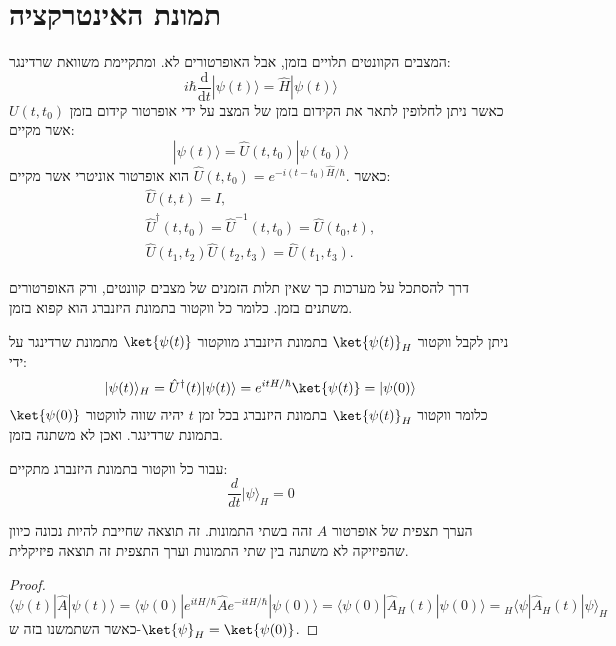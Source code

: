 \documentclass{tstextbook}
\begin{document}
\section{תמונת האינטרקציה}

\begin{reminder}
המצבים הקוונטים תלויים בזמן, אבל האופרטורים לא. ומתקיימת משוואת שרדינגר:
$$i\hbar{\frac{\mathrm{d}}{\mathrm{d} t}}|\psi(t)\rangle={\hat{H}}|\psi(t)\rangle$$
כאשר ניתן לחלופין לתאר את הקידום בזמן של המצב על ידי אופרטור קידום בזמן \(U(t,t_{0})\) אשר מקיים:
$$|\psi(t)\rangle=\hat{U}(t,t_{0})|\psi(t_{0})\rangle$$
כאשר \(\hat{U}(t,t_{0})=e^{-i(t-t_{0})\hat{H}/\hbar}.\) הוא אופרטור אוניטרי אשר מקיים:
$$\begin{array}{c}{{\hat{U}(t,t)=I,}}\\ {{\hat{U}^{\dagger}(t,t_{0})=\hat{U}^{-1}(t,t_{0})=\hat{U}(t_{0},t),}}\\ {{\hat{U}(t_{1},t_{2})\hat{U}(t_{2},t_{3})=\hat{U}(t_{1},t_{3}).}}\end{array}$$

\end{reminder}
\begin{definition}
דרך להסתכל על מערכות כך שאין תלות הזמנים של מצבים קוונטים, ורק האופרטורים משתנים בזמן. כלומר כל ווקטור בתמונת היזנברג הוא קפוא בזמן.

\end{definition}
\begin{proposition}
ניתן לקבל ווקטור \(\ket{\psi(t)}_{H}\) בתמונת היזנברג מווקטור \(\ket{\psi(t)}\) מתמונת שרדינגר על ידי:
$$|\psi(t)\rangle_{H}=\hat{U}^{\dagger}(t)|\psi(t)\rangle=e^{ itH/\hbar }\ket{\psi(t)} =|\psi(0)\rangle$$
כלומר ווקטור \(\ket{\psi(t)}_{H}\) בתמונת היזנברג בכל זמן \(t\) יהיה שווה לווקטור \(\ket{\psi(0)}\) בתמונת שרדינגר. ואכן לא משתנה בזמן.

\end{proposition}
\begin{corollary}
עבור כל ווקטור בתמונת היזנברג מתקיים:
$${\frac{d}{d t}}|\psi\rangle_{H}=0$$

\end{corollary}
\begin{proposition}
הערך תצפית של אופרטור \(A\) זהה בשתי התמונות. זה תוצאה שחייבת להיות נכונה כיוון שהפיזיקה לא משתנה בין שתי התמונות וערך התצפית זה תוצאה פיזיקלית.

\end{proposition}
\begin{proof}
$$\langle\psi(t)|\hat{A}|\psi(t)\rangle=\langle\psi(0)|e^{i t H/\hbar}\hat{A}e^{-i t H/\hbar}|\psi(0)\rangle=\langle\psi(0)|\hat{A}_{H}(t)|\psi(0)\rangle={}_{H}\langle\psi|\hat{A}_{H}(t)|\psi\rangle_{H}$$
כאשר השתמשנו בזה ש-\(\ket{\psi}_{H}=\ket{\psi(0)}\).

\end{proof}
\end{document}
